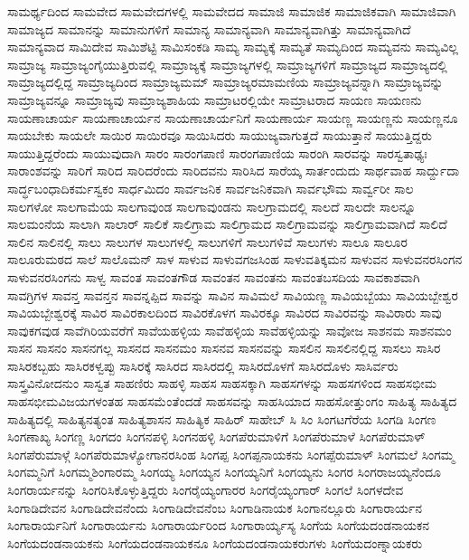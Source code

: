 {ಸಾಮರ್ಥ್ಯದಿಂದ
ಸಾಮವೇದ
ಸಾಮವೇದಗಳಲ್ಲಿ
ಸಾಮವೇದದ
ಸಾಮಾಜಿ
ಸಾಮಾಜಿಕ
ಸಾಮಾಜಿಕವಾಗಿ
ಸಾಮಾಜಿವಾಗಿ
ಸಾಮಾಜ್ಯದ
ಸಾಮಾನನ್ನು
ಸಾಮಾನುಗಳಿಗೆ
ಸಾಮಾನ್ಯ
ಸಾಮಾನ್ಯವಾಗಿ
ಸಾಮಾನ್ಯವಾಗಿತ್ತು
ಸಾಮಾನ್ಯವಾಗಿದೆ
ಸಾಮಾನ್ಯವಾದ
ಸಾಮಿದೇವ
ಸಾಮಿಶೆಟ್ಟಿ
ಸಾಮಿಸಂಕಡಿ
ಸಾಮ್ಯ
ಸಾಮ್ಯಕ್ಕೆ
ಸಾಮ್ಯತೆ
ಸಾಮ್ಯದಿಂದ
ಸಾಮ್ಯವನು
ಸಾಮ್ಯವಿಲ್ಲ
ಸಾಮ್ರಾಜ್ಯ
ಸಾಮ್ರಾಜ್ಯಂಗೈಯುತ್ತಿರುವಲ್ಲಿ
ಸಾಮ್ರಾಜ್ಯಕ್ಕೆ
ಸಾಮ್ರಾಜ್ಯಗಳಲ್ಲಿ
ಸಾಮ್ರಾಜ್ಯಗಳಿಗೆ
ಸಾಮ್ರಾಜ್ಯದ
ಸಾಮ್ರಾಜ್ಯದಲ್ಲಿ
ಸಾಮ್ರಾಜ್ಯದಲ್ಲಿದ್ದ
ಸಾಮ್ರಾಜ್ಯದಿಂದ
ಸಾಮ್ರಾಜ್ಯಮಮ್
ಸಾಮ್ರಾಜ್ಯರಮಾಮಣಿಯ
ಸಾಮ್ರಾಜ್ಯವನ್ನಾಗಿ
ಸಾಮ್ರಾಜ್ಯವನ್ನು
ಸಾಮ್ರಾಜ್ಯವನ್ನೂ
ಸಾಮ್ರಾಜ್ಯವು
ಸಾಮ್ರಾಜ್ಯಶಾಹಿಯ
ಸಾಮ್ರಾಟರಲ್ಲಿಯೇ
ಸಾಮ್ರಾಟರಾದ
ಸಾಯಣ
ಸಾಯಣನು
ಸಾಯಣಾಚಾರ್ಯ
ಸಾಯಣಾಚಾರ್ಯನ
ಸಾಯಣಾಚಾರ್ಯನಿಗೆ
ಸಾಯಣಾರ್ಯ
ಸಾಯಣ್ಣ
ಸಾಯಣ್ಣನು
ಸಾಯಣ್ಣನೂ
ಸಾಯಬೇಕು
ಸಾಯಲೇ
ಸಾಯಿರ
ಸಾಯಿರವೂ
ಸಾಯಿಸಿದರು
ಸಾಯುಜ್ಯವಾಗುತ್ತದೆ
ಸಾಯುತ್ತಾನೆ
ಸಾಯುತ್ತಿದ್ದರು
ಸಾಯುತ್ತಿದ್ದರೆಂದು
ಸಾಯುವುದಾಗಿ
ಸಾರಂ
ಸಾರಂಗಪಾಣಿ
ಸಾರಂಗಪಾಣಿಯ
ಸಾರಂಗಿ
ಸಾರವನ್ನು
ಸಾರಸ್ವತಾಢ್ಯಃ
ಸಾರಾಂಶವನ್ನು
ಸಾರಿಗೆ
ಸಾರಿದ
ಸಾರಿದರೆಂದು
ಸಾರಿದವನು
ಸಾರಿಸಿದ
ಸಾರೆಯ್ಕ
ಸಾರ್ತಂದುದು
ಸಾರ್ಥವಾಹ
ಸಾರ್ದ್ದುದಾ
ಸಾರ್ದ್ಧಬಂಧಾದಿಕರ್ಮಸ್ವಕಂ
ಸಾರ್ಧಮಿದಂ
ಸಾರ್ವಜನಿಕ
ಸಾರ್ವಜನಿಕವಾಗಿ
ಸಾರ್ವಭೌಮ
ಸಾರ್ವ್ವರೀ
ಸಾಲ
ಸಾಲಗಳೋ
ಸಾಲಗಾಮೆಯ
ಸಾಲಗಾವುಂಡ
ಸಾಲಗಾವುಂಡನು
ಸಾಲಗ್ರಾಮದಲ್ಲಿ
ಸಾಲದೆ
ಸಾಲದೇ
ಸಾಲನ್ನೂ
ಸಾಲಮಂನೆಯ
ಸಾಲಾಗಿ
ಸಾಲಾರ್
ಸಾಲಿಕೆ
ಸಾಲಿಗ್ರಾಮ
ಸಾಲಿಗ್ರಾಮದ
ಸಾಲಿಗ್ರಾಮವನ್ನು
ಸಾಲಿಗ್ರಾಮವಾಗಿದೆ
ಸಾಲಿದೆ
ಸಾಲಿನ
ಸಾಲಿನಲ್ಲಿ
ಸಾಲು
ಸಾಲುಗಳ
ಸಾಲುಗಳಲ್ಲಿ
ಸಾಲುಗಳಿಗೆ
ಸಾಲುಗಳಿವೆ
ಸಾಲುಗಳು
ಸಾಲೂ
ಸಾಲೂರ
ಸಾಲೂರುಮಠದ
ಸಾಲೆ
ಸಾಲೊಮನ್
ಸಾಳ
ಸಾಳುವ
ಸಾಳುವಗಜಸಿಂಹ
ಸಾಳುವತಿಕ್ಕಮನ
ಸಾಳುವನ
ಸಾಳುವನರಸಿಂಗನ
ಸಾಳುವನರಸಿಂಗನು
ಸಾಳ್ವ
ಸಾವಂತ
ಸಾವಂತಗೌಡ
ಸಾವಂತನ
ಸಾವಂತನು
ಸಾವಂತಬಸದಿಯ
ಸಾವಕಾಶವಾಗಿ
ಸಾವಗ್ರಿಗಳ
ಸಾವನ್ತ
ಸಾವನ್ತನ
ಸಾವನ್ನಪ್ಪಿದ
ಸಾವನ್ನು
ಸಾವಿನ
ಸಾವಿಮಲೆ
ಸಾವಿಯಣ್ಣ
ಸಾವಿಯಬ್ಬೆಯು
ಸಾವಿಯಬ್ಬೇಶ್ವರ
ಸಾವಿಯಬ್ಬೇಶ್ವರಕ್ಕೆ
ಸಾವಿರ
ಸಾವಿರಕಾಲದಿಂದ
ಸಾವಿರಕೊಳಗ
ಸಾವಿರಕ್ಕೂ
ಸಾವಿರದ
ಸಾವಿರವನ್ನು
ಸಾವಿರಾರು
ಸಾವು
ಸಾವುಕಗವುಡ
ಸಾವೆಗಿರಿಯವರೆಗೆ
ಸಾವೆಯಹಳ್ಳಿಯ
ಸಾವೆಹಳ್ಳಿಯ
ಸಾವೆಹಳ್ಳಿಯನ್ನು
ಸಾವೋಜ
ಸಾಶನಮ
ಸಾಶನಮಂ
ಸಾಸನ
ಸಾಸನಂ
ಸಾಸನಗಲ್ಲ
ಸಾಸನದ
ಸಾಸನಮಂ
ಸಾಸನವ
ಸಾಸನವನ್ನು
ಸಾಸಲಿನ
ಸಾಸಲಿನಲ್ಲಿದ್ದ
ಸಾಸಲು
ಸಾಸಿರ
ಸಾಸಿರಕಬ್ಬಹು
ಸಾಸಿರಕಳ್ವಪ್ಪು
ಸಾಸಿರಕ್ಕೆ
ಸಾಸಿರದ
ಸಾಸಿರದಲ್ಲಿ
ಸಾಸಿರದೊಳಗೆ
ಸಾಸಿರದೊಳು
ಸಾಸಿರ್ವರು
ಸಾಸ್ತ್ರವಿನೋದನುಂ
ಸಾಸ್ವತ
ಸಾಹಣಿರು
ಸಾಹಳ್ಳಿ
ಸಾಹಸ
ಸಾಹಸಕ್ಕಾಗಿ
ಸಾಹಸಗಳನ್ನು
ಸಾಹಸಗಳಿಂದ
ಸಾಹಸಭೀಮ
ಸಾಹಸಭೀಮವಿಜಯಗಳಂತಹ
ಸಾಹಸಮೆಂತೆಂದಡೆ
ಸಾಹಸವನ್ನು
ಸಾಹಸಿಯಾದ
ಸಾಹಸೋತ್ತುಂಗಂ
ಸಾಹಿತ್ಯ
ಸಾಹಿತ್ಯದ
ಸಾಹಿತ್ಯದಲ್ಲಿ
ಸಾಹಿತ್ಯನತ್ಯಂತ
ಸಾಹಿತ್ಯಶಾಸನ
ಸಾಹಿತ್ಯಿಕ
ಸಾಹಿರ್
ಸಾಹೇಬ್
ಸಿ
ಸಿಂ
ಸಿಂಗಟಗೆರೆಯ
ಸಿಂಗಡಿ
ಸಿಂಗಣ
ಸಿಂಗಣಾಖ್ಯ
ಸಿಂಗಣ್ಣ
ಸಿಂಗದಂ
ಸಿಂಗನಪಳ್ಳಿ
ಸಿಂಗನಹಳ್ಳಿ
ಸಿಂಗಪೆರುಮಾಳಿಗೆ
ಸಿಂಗಪೆರುಮಾಳೆ
ಸಿಂಗಪೆರುಮಾಳ್
ಸಿಂಗಪೆರುಮಾಳ್ಗೆ
ಸಿಂಗಪೆರುಮಾಳ್ಯೋಗಾನರಸಿಂಹ
ಸಿಂಗಪ್ಪ
ಸಿಂಗಪ್ಪನಾಯಕನು
ಸಿಂಗಪ್ಪೆರುಮಾಳ್
ಸಿಂಗಮಲೆ
ಸಿಂಗಮ್ಮ
ಸಿಂಗಮ್ಮನಿಗೆ
ಸಿಂಗಮ್ಮಶಿಂಗಾರಮ್ಮ
ಸಿಂಗಯ್ಯ
ಸಿಂಗಯ್ಯನ
ಸಿಂಗಯ್ಯನಿಗೆ
ಸಿಂಗಯ್ಯನು
ಸಿಂಗರ
ಸಿಂಗರಾಜಯ್ಯನೆಂದೂ
ಸಿಂಗರಾರ್ಯನನ್ನು
ಸಿಂಗರಿಸಿಕೊಳ್ಳುತ್ತಿದ್ದರು
ಸಿಂಗರೈಯ್ಯಂಗಾರರ
ಸಿಂಗರೈಯ್ಯಂಗಾರ್
ಸಿಂಗಲೆ
ಸಿಂಗಳದೇವ
ಸಿಂಗಾಡಿದೇವನ
ಸಿಂಗಾಡಿದೇವನೆಂದು
ಸಿಂಗಾಡಿದೇವನೆಂಬ
ಸಿಂಗಾಡಿನಾಯಕ
ಸಿಂಗಾನಲ್ಲೂರು
ಸಿಂಗಾರಾರ್ಯನ
ಸಿಂಗಾರಾರ್ಯನಿಗೆ
ಸಿಂಗಾರಾರ್ಯನು
ಸಿಂಗಾರಾರ್ಯರಿಂದ
ಸಿಂಗಾರಾರ್ಯ್ಯಸ್ಯ
ಸಿಂಗೆಯ
ಸಿಂಗೆಯದಂಡನಾಯಕನ
ಸಿಂಗೆಯದಂಡನಾಯಕನು
ಸಿಂಗೆಯದಂಡನಾಯಕನೂ
ಸಿಂಗೆಯದಂಡನಾಯಕರುಗಳು
ಸಿಂಗೆಯದಂಣ್ನಾಯಕರು
}
